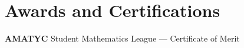 \documentclass[./Resume.tex]{subfiles}
\begin{document}
\section{Awards and Certifications}
	{\bfseries AMATYC} Student Mathematics League --- Certificate of Merit
\end{document}
